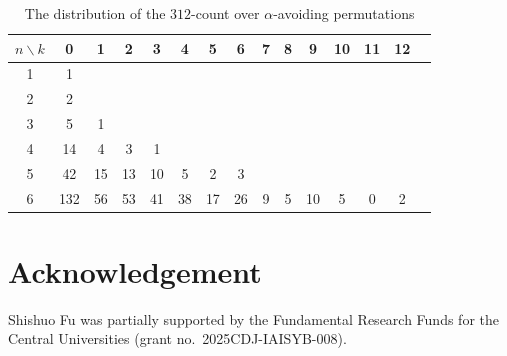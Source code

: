 \documentclass[12pt]{amsart}
\numberwithin{equation}{section}
\theoremstyle{plain}
\begin{document}
\begin{table}[!h]
\renewcommand{\arraystretch}{1.1}
    \centering
    \begin{tabular}{c|cccccccccccccc}
        $n \backslash k$ & 0 & 1 & 2 & 3 & 4 & 5 & 6 & 7 & 8 & 9 & 10 & 11 & 12 \\ \hline
        1 & 1 \\ 
        2 & 2 \\ 
        3 & 5 & 1  \\ 
        4 & 14 & 4 & 3 & 1  \\ 
        5 & 42 & 15 & 13 & 10 & 5 & 2 & 3 \\ 
        6 & 132 & 56 & 53 & 41 & 38 & 17 & 26 & 9 & 5 & 10 & 5 & 0 & 2 \\
    \end{tabular}
    \vspace{3mm}
    \caption{The distribution of the $312$-count over $\alpha$-avoiding permutations \label{tab:S^312(q,x)} }
\end{table}



	
	

	
	
	

\section*{Acknowledgement} 

Shishuo Fu was partially supported by the Fundamental Research Funds for the Central Universities (grant no.~2025CDJ-IAISYB-008).
	
	
	
\end{document}
